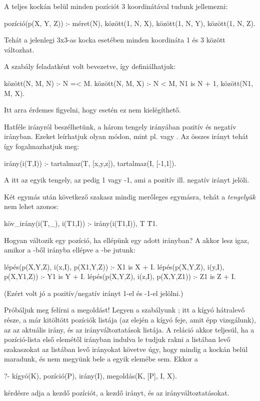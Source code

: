 A teljes kockán belül minden pozíciót 3
koordinátával tudunk jellemezni:
\begin{program}
pozíció(p(X, Y, Z)) :-
    méret(N), között(1, N, X),
    között(1, N, Y), között(1, N, Z).
\end{program}
Tehát a jelenlegi 3x3-as kocka esetében minden
koordináta 1 és 3 között változhat.

A  szabály feladatként volt bevezetve,
így definiálhatjuk:
\begin{program}
között(N, M, N) :- N =< M.
között(N, M, X) :-
    N < M, N1 is N + 1,
    között(N1, M, X).
\end{program}
Itt arra érdemes figyelni, hogy  esetén ez
nem kielégíthető.

Hatféle irányról beszélhetünk, a három tengely
irányában pozitív és negatív irányban. Ezeket
leírhatjuk olyan módon, mint pl.  vagy
. Az összes irányt tehát így
fogalmazhatjuk meg:
\begin{program}
irány(i(T,I)) :-
    tartalmaz(T, [x,y,z]),
    tartalmaz(I, [-1,1]).
\end{program}
A  itt az egyik tengely, az  pedig 1
vagy -1, ami a pozitív ill. negatív irányt jelöli.

Két egymás után következő szakasz mindig merőleges
egymásra, tehát a \emph{tengelyük} nem lehet azonos:
\begin{program}
köv_irány(i(T,_), i(T1,I)) :-
    irány(i(T1,I)), T \= T1.
\end{program}

Hogyan változik egy pozíció, ha ellépünk egy adott
irányban? A  akkor lesz igaz,
amikor a -ből  irányba ellépve a
-be jutunk:
\begin{program}
lépés(p(X,Y,Z), i(x,I), p(X1,Y,Z)) :- X1 is X + I.
lépés(p(X,Y,Z), i(y,I), p(X,Y1,Z)) :- Y1 is Y + I.
lépés(p(X,Y,Z), i(z,I), p(X,Y,Z1)) :- Z1 is Z + I.
\end{program}
(Ezért volt jó a pozitív/negatív irányt 1-el és
-1-el jelölni.)

Próbáljuk meg felírni a megoldást! Legyen a
szabályunk ; itt  a
kígyó hátralevő része,  a már kitöltött
pozíciók listája (az elején a kígyó feje, amit épp
vizsgálunk), az  az aktuális irány, és 
az irányváltoztatások listája. A reláció akkor
teljesül, ha a  pozíció-lista első elemétől
 irányban indulva le tudjuk rakni a 
listában levő szakaszokat az  listában levő
irányokat követve úgy, hogy mindig a kockán belül
maradunk, és nem megyünk bele a  egyik
elemébe sem. Ekkor a
\begin{query}
?- kígyó(K), pozíció(P), irány(I),
   megoldás(K, [P], I, X).
\end{query}
kérdésre  adja a kezdő pozíciót,  a
kezdő irányt, és  az irányváltoztatásokat.

